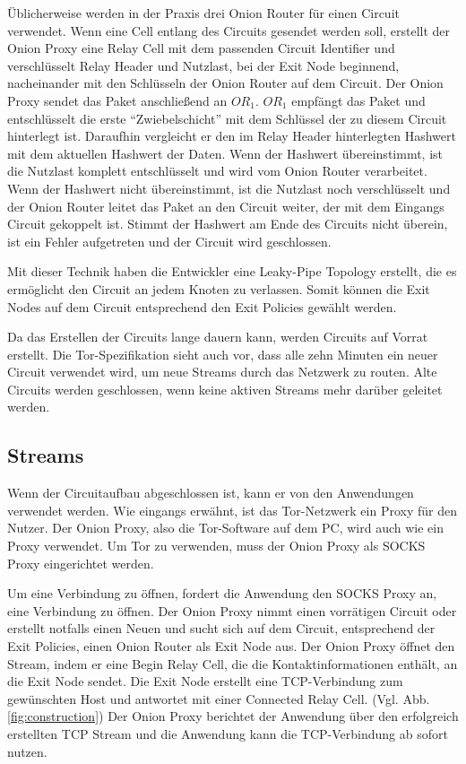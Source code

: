 \documentclass[fleqn,envcountsame,runningheads,10pt,a4paper]{llncs}
\begin{document}
Üblicherweise werden in der Praxis drei Onion Router für einen Circuit 
verwendet. Wenn eine Cell entlang des Circuits gesendet werden soll, erstellt 
der Onion Proxy eine Relay Cell mit dem passenden Circuit Identifier und 
verschlüsselt Relay Header und Nutzlast, bei der Exit Node beginnend, 
nacheinander mit den Schlüsseln der Onion Router auf dem Circuit. Der Onion 
Proxy sendet das Paket anschließend an $\textit{OR}_1$. $\textit{OR}_1$ empfängt 
das Paket und entschlüsselt die erste ``Zwiebelschicht'' mit dem Schlüssel der 
zu diesem Circuit hinterlegt ist. Daraufhin vergleicht er den im Relay Header 
hinterlegten Hashwert mit dem aktuellen Hashwert der Daten. Wenn der Hashwert 
übereinstimmt, ist die Nutzlast komplett entschlüsselt und wird vom Onion Router 
verarbeitet. Wenn der Hashwert nicht übereinstimmt, ist die Nutzlast noch 
verschlüsselt und der Onion Router leitet das Paket an den Circuit weiter, der 
mit dem Eingangs Circuit gekoppelt ist. Stimmt der Hashwert am Ende des Circuits 
nicht überein, ist ein Fehler aufgetreten und der Circuit wird geschlossen.

Mit dieser Technik haben die Entwickler eine Leaky-Pipe Topology erstellt, die 
es ermöglicht den Circuit an jedem Knoten zu verlassen. Somit können die Exit 
Nodes auf dem Circuit entsprechend den Exit Policies gewählt werden.

Da das Erstellen der Circuits lange dauern kann, werden Circuits auf Vorrat 
erstellt. Die Tor-Spezifikation sieht auch vor, dass alle zehn Minuten 
ein neuer Circuit verwendet wird, um neue Streams durch das Netzwerk zu routen. 
Alte Circuits werden geschlossen, wenn keine aktiven Streams mehr darüber 
geleitet werden.

\subsection{Streams}

Wenn der Circuitaufbau abgeschlossen ist, kann er von den Anwendungen verwendet 
werden. Wie eingangs erwähnt, ist das Tor-Netzwerk ein Proxy für den Nutzer. Der 
Onion Proxy, also die Tor-Software auf dem PC, wird auch wie ein Proxy 
verwendet. Um Tor zu verwenden, muss der Onion Proxy als SOCKS Proxy 
\cite{rfc:socks} eingerichtet werden.

Um eine Verbindung zu öffnen, fordert die Anwendung den SOCKS Proxy an, eine 
Verbindung zu öffnen. Der Onion Proxy nimmt einen vorrätigen Circuit oder 
erstellt notfalls einen Neuen und sucht sich auf dem Circuit, entsprechend der 
Exit Policies, einen Onion Router als Exit Node aus. Der Onion Proxy öffnet den 
Stream, indem er eine Begin Relay Cell, die die Kontaktinformationen enthält, an 
die Exit Node sendet. Die Exit Node erstellt eine TCP-Verbindung zum gewünschten 
Host und antwortet mit einer Connected Relay Cell. (Vgl. Abb. 
\ref{fig:construction}) Der Onion Proxy berichtet der Anwendung über den 
erfolgreich erstellten TCP Stream und die Anwendung kann die TCP-Verbindung ab 
sofort nutzen.
\end{document}
